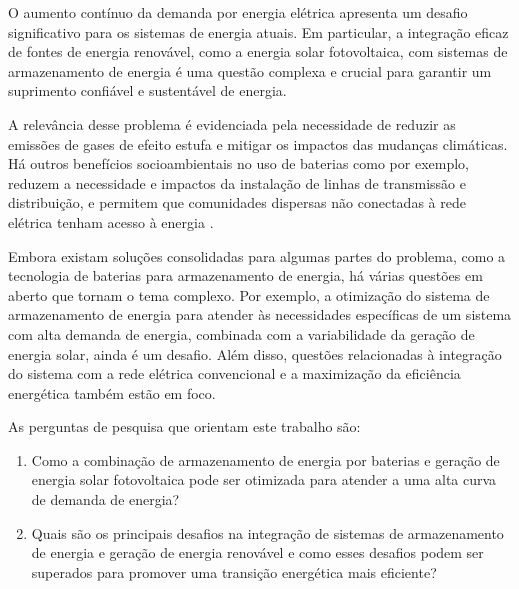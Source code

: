 

    

O aumento contínuo da demanda por energia elétrica apresenta um desafio significativo para os sistemas de energia atuais. Em particular, a integração eficaz de fontes de energia renovável, como a energia solar fotovoltaica, com sistemas de armazenamento de energia é uma questão complexa e crucial para garantir um suprimento confiável e sustentável de energia. 

A relevância desse problema é evidenciada pela necessidade de reduzir as emissões de gases de efeito estufa e mitigar os impactos das mudanças climáticas. Há outros benefícios socioambientais no uso de baterias como por exemplo, reduzem
a necessidade e impactos da instalação de linhas de transmissão e distribuição, e permitem que comunidades dispersas não conectadas à rede elétrica tenham acesso à energia \cite{wef2019}.

Embora existam soluções consolidadas para algumas partes do problema, como a tecnologia de baterias para armazenamento de energia, há várias questões em aberto que tornam o tema complexo. Por exemplo, a otimização do sistema de armazenamento de energia para atender às necessidades específicas de um sistema com alta demanda de energia, combinada com a variabilidade da geração de energia solar, ainda é um desafio. Além disso, questões relacionadas à integração do sistema com a rede elétrica convencional e a maximização da eficiência energética também estão em foco.

As perguntas de pesquisa que orientam este trabalho são:

\begin{enumerate}
   \item Como a combinação de armazenamento de energia por baterias e geração de energia solar fotovoltaica pode ser otimizada para atender a uma alta curva de demanda de energia?
    
   \item Quais são os principais desafios na integração de sistemas de armazenamento de energia e geração de energia renovável e como esses desafios podem ser superados para promover uma transição energética mais eficiente?
\end{enumerate}



